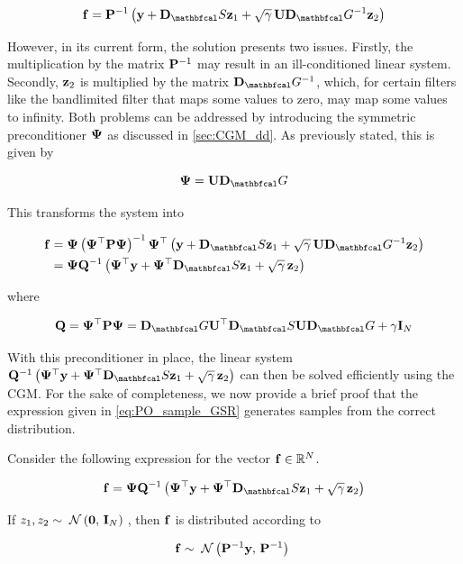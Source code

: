 \begin{equation}
    \f = \PP^{-1} \left(\y + \D_\St \z_1 + \sqrt{\gamma} \, \U \D_\Gt^{-1} \z_2 \right)
\end{equation}

However, in its current form, the solution presents two issues. Firstly, the multiplication by the matrix $\mathbf{P}^{-1}$ may result in an ill-conditioned linear system. Secondly, $\mathbf{z}_2$ is multiplied by the matrix $\D_\Gt^{-1}$, which, for certain filters like the bandlimited filter that maps some values to zero, may map some values to infinity. Both problems can be addressed by introducing the symmetric preconditioner $\mathbf{\Psi}$ as discussed in \cref{sec:CGM_dd}. As previously stated, this is given by

\begin{equation}
    \PSI = \U \D_\Gt
\end{equation}

This transforms the system into 

\begin{align}
    \f &= \PSI \left(\PSI^\top \PP \PSI \right)^{-1} \PSI^\top \left(\y + \D_\St \z_1 + \sqrt{\gamma} \, \U \D_\Gt^{-1} \z_2 \right) \notag \\
    &= \PSI \Q^{-1} \left(\PSI^\top \y + \PSI^\top \D_\St \z_1 + \sqrt{\gamma} \, \z_2\right)
    \label{eq:PO_sample_GSR}
\end{align}

where 

$$
\Q = \PSI^\top \PP \PSI  = \D_\Gt \U^\top \D_\St \U \D_\Gt + \gamma \I_N 
$$

With this preconditioner in place, the linear system $\Q^{-1} \left(\PSI^\top \y + \PSI^\top \D_\St \z_1 + \sqrt{\gamma} \, \z_2\right)$ can then be solved efficiently using the CGM. For the sake of completeness, we now provide a brief proof that the expression given in \cref{eq:PO_sample_GSR} generates samples from the correct distribution. 

\begin{theorem}
    Consider the following expression for the vector $\mathbf{f} \in \mathbb{R}^N$. 

    $$
    \f = \PSI \Q^{-1} \left(\PSI^\top \y + \PSI^\top \D_\St \z_1 + \sqrt{\gamma} \, \z_2\right)
    $$
    
    If $z_1, z_2 \sim \; \mathcal{N}\left(\mathbf{0}, \, \mathbf{I}_N\right) \;$, then $\mathbf{f}$ is distributed according to
    
    $$
    \mathbf{f} \sim \; \mathcal{N}\left(\mathbf{P}^{-1} \mathbf{y} , \, \mathbf{P}^{-1}\right) \;
    $$ 

    \label{the:GSR_PO}
\end{theorem}

